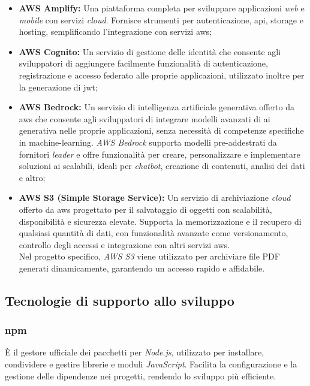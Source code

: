 \begin{itemize}
\item \textbf{AWS Amplify:} Una piattaforma completa per sviluppare applicazioni \textit{web} e \textit{mobile} con servizi \textit{cloud}. 
Fornisce strumenti per autenticazione, \gls{api}, storage e hosting, semplificando l'integrazione con servizi \gls{aws};
\item \textbf{AWS Cognito:} Un servizio di gestione delle identità che consente agli sviluppatori di aggiungere facilmente funzionalità di autenticazione, registrazione e accesso federato alle proprie applicazioni,
utilizzato inoltre per la generazione di \gls{jwt};
\item \textbf{AWS Bedrock:} Un servizio di intelligenza artificiale generativa offerto da \gls{aws} che consente agli sviluppatori di integrare modelli avanzati di \gls{ai} generativa nelle proprie applicazioni, senza necessità di competenze specifiche in \gls{machine-learning}. 
\textit{AWS Bedrock} supporta modelli pre-addestrati da fornitori \textit{leader} e offre funzionalità per creare, personalizzare e implementare soluzioni \gls{ai} scalabili, ideali per \textit{chatbot}, creazione di contenuti, analisi dei dati e altro;
\item \textbf{AWS S3 (Simple Storage Service):} Un servizio di archiviazione \textit{cloud} offerto da \gls{aws} progettato per il salvataggio di oggetti con scalabilità, disponibilità e sicurezza elevate.
Supporta la memorizzazione e il recupero di qualsiasi quantità di dati, con funzionalità avanzate come versionamento, controllo degli accessi e integrazione con altri servizi \gls{aws}. \\
Nel progetto specifico, \textit{AWS S3} viene utilizzato per archiviare file PDF generati dinamicamente, garantendo un accesso rapido e affidabile.
\end{itemize}

\pagebreak
\subsection{Tecnologie di supporto allo sviluppo}
\label{sez:tecnologie-supporto-sviluppo}

\subsubsection{\gls{npm}}

È il gestore ufficiale dei pacchetti per \textit{Node.js}, utilizzato per installare, condividere e gestire librerie e moduli \textit{JavaScript}. 
Facilita la configurazione e la gestione delle dipendenze nei progetti, rendendo lo sviluppo più efficiente.


